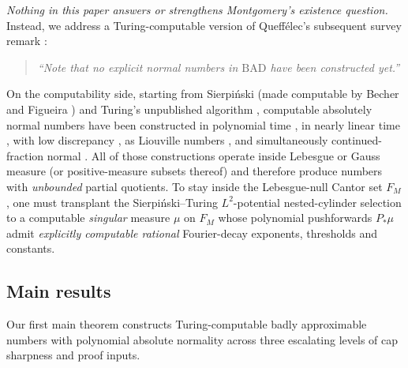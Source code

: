 \documentclass[11pt]{article}
\newcommand{\BAD}{\mathrm{BAD}}
\begin{document}
\emph{Nothing in this paper answers or strengthens Montgomery's existence question.} Instead, we address a Turing-computable version of Queff\'elec's subsequent survey remark \cite[pp.~232--233]{Queffelec2006}:
\begin{quote}
\emph{``Note that no explicit normal numbers in $\BAD$ have been constructed yet.''}
\end{quote}
On the computability side, starting from Sierpi\'nski \cite{Sierpinski1917} (made computable by Becher and Figueira \cite{BecherFigueira2002}) and Turing's unpublished algorithm \cite{BecherFigueiraPicchi2007}, computable absolutely normal numbers have been constructed in polynomial time \cite{BecherHeiberSlaman2013}, in nearly linear time \cite{LutzMayordomo2021}, with low discrepancy \cite{Levin1999,AlvarezBecher2017,ABSS2017}, as Liouville numbers \cite{BecherHeiberSlaman2015}, and simultaneously continued-fraction normal \cite{Scheerer2017,BecherYuhjtman2019}. All of those constructions operate inside Lebesgue or Gauss measure (or positive-measure subsets thereof) and therefore produce numbers with \emph{unbounded} partial quotients. To stay inside the Lebesgue-null Cantor set $F_M$, one must transplant the Sierpi\'nski--Turing $L^2$-potential nested-cylinder selection to a computable \emph{singular} measure $\mu$ on $F_M$ whose polynomial pushforwards $P_*\mu$ admit \emph{explicitly computable rational} Fourier-decay exponents, thresholds and constants.

\subsection{Main results}

Our first main theorem constructs Turing-computable badly approximable numbers with polynomial absolute normality across three escalating levels of cap sharpness and proof inputs.
\end{document}
